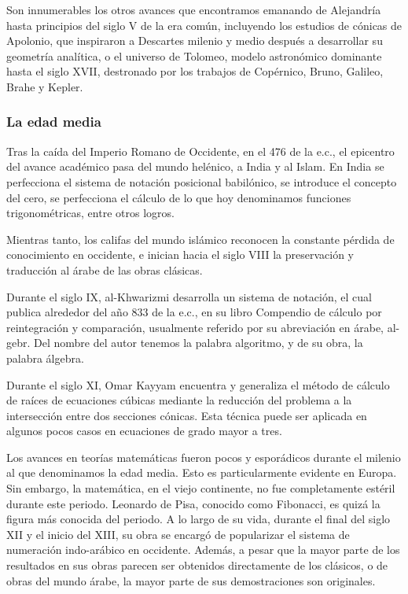 Son innumerables los otros avances que encontramos emanando de Alejandría hasta principios del siglo V de la era común, incluyendo los estudios de cónicas de Apolonio, que inspiraron a Descartes milenio y medio después a desarrollar su geometría analítica, o el universo de Tolomeo, modelo astronómico dominante hasta el siglo XVII, destronado por los trabajos de Copérnico, Bruno, Galileo, Brahe y Kepler. 

\subsubsection*{La edad media}

Tras la caída del Imperio Romano de Occidente, en el 476 de la e.c., el epicentro del avance académico pasa del mundo helénico, a India y al Islam. En India se perfecciona el sistema de notación posicional babilónico, se introduce el concepto del cero, se perfecciona el cálculo de lo que hoy denominamos funciones trigonométricas, entre otros logros.

Mientras tanto, los califas del mundo islámico reconocen la constante pérdida de conocimiento en occidente, e inician hacia el siglo VIII la preservación y traducción al árabe de las obras clásicas.

Durante el siglo IX, al-Khwarizmi desarrolla un sistema de notación, el cual publica alrededor del año 833 de la e.c., en su libro Compendio de cálculo por reintegración y comparación, usualmente referido por su abreviación en árabe, al-gebr. Del nombre del autor tenemos la palabra algoritmo, y de su obra, la palabra álgebra.

Durante el siglo XI, Omar Kayyam encuentra y generaliza el método de cálculo de raíces de ecuaciones cúbicas mediante la reducción del problema a la intersección entre dos secciones cónicas. Esta técnica puede ser aplicada en algunos pocos casos en ecuaciones de grado mayor a tres. 

Los avances en teorías matemáticas fueron pocos y esporádicos durante el milenio al que denominamos la edad media. Esto es particularmente evidente en Europa. Sin embargo, la matemática, en el viejo continente, no fue completamente estéril durante este periodo. Leonardo de Pisa, conocido como Fibonacci, es quizá la figura más conocida del periodo. A lo largo de su vida, durante el final del siglo XII y el inicio del XIII, su obra se encargó de popularizar el sistema de numeración indo-arábico en occidente. Además, a pesar que la mayor parte de los resultados en sus obras parecen ser obtenidos directamente de los clásicos, o de obras del mundo árabe, la mayor parte de sus demostraciones son originales.

